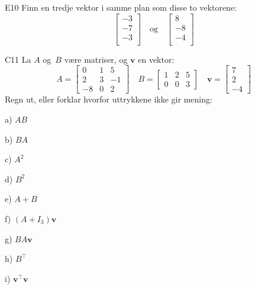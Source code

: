 \documentclass[a4paper,norsk,11pt]{interaktiv}
\newcommand{\V}[1]{\mathbf{#1}}
\newcommand{\vvv}[3]{\begin{bmatrix} #1 \\ #2 \\ #3 \end{bmatrix}}
\newcommand{\tr}{^\top}
\begin{document}
\begin{oppgave}{E10}
	Finn en tredje vektor i samme plan som disse to vektorene:
\[
	\begin{bmatrix}
	-3  \\
	-7 \\
	-3 \\
	\end{bmatrix}
	\quad\text{og}\quad
	\begin{bmatrix}
	8  \\
	-8 \\
	-4 \\
	\end{bmatrix}
\]
\end{oppgave}



%
%
%
%
%
%

\begin{oppgave}{C11}
La $A$ og~$B$ være matriser, og $\V{v}$ en vektor:
\[
A =
\begin{bmatrix}
 0 & 1 &  5 \\
 2 & 3 & -1 \\
-8 & 0 & 2
\end{bmatrix}
\quad
B =
\begin{bmatrix}
1 & 2 & 5 \\
0 & 0 & 3
\end{bmatrix}
\quad
\V{v} = \vvv{7}{2}{-4}
\]
Regn ut, eller forklar hvorfor uttrykkene ikke gir mening:

\noindent
\begin{minipage}{0.14\textwidth}

a) $AB$


b) $BA$


c) $A^2$

\end{minipage}
\begin{minipage}{0.19\textwidth}

d) $B^2$


e) $A+B$


f) $(A + I_3) \V{v}$

\end{minipage}
\begin{minipage}{0.1\textwidth}

g) $BA\V{v}$


h) $B\tr$


i) $\V{v}\tr \V{v}$

\end{minipage}
\end{oppgave}
\end{document}
